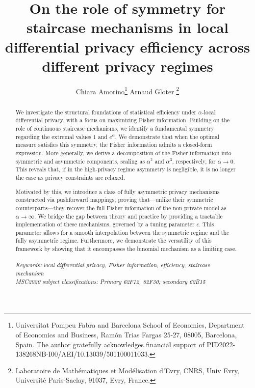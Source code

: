 \documentclass[a4paper, 11pt]{article}
\title{On the role of symmetry for staircase mechanisms in local differential privacy efficiency across different privacy regimes}
\author{Chiara Amorino\thanks{ Universitat Pompeu Fabra and Barcelona School of Economics, Department of Economics and Business, Ram\'on Trias Fargas 25-27, 08005, Barcelona, Spain. The author gratefully acknowledges financial support of PID2022-138268NB-I00/AEI/10.13039/501100011033.} \qquad Arnaud Gloter \thanks{Laboratoire de Math\'ematiques et Mod\'elisation d'Evry, CNRS, Univ Evry, Universit\'e Paris-Saclay, 91037, Evry, France.}}
\theoremstyle{definition}
\begin{document}
\maketitle






\begin{abstract}
\noindent 
We investigate the structural foundations of statistical efficiency under $\alpha$-local differential privacy, with a focus on maximizing Fisher information. Building on the role of continuous staircase mechanisms, we identify a fundamental symmetry regarding the extremal values $1$ and $e^{\alpha}$. We demonstrate that when the optimal measure satisfies this symmetry, the Fisher information admits a closed-form expression. More generally, we derive a decomposition of the Fisher information into symmetric and asymmetric components, scaling as $\alpha^{2}$ and $\alpha^{3}$, respectively,  for $\alpha \to 0$. This reveals that, if in the high-privacy regime asymmetry is negligible, it is no longer the case as privacy constraints are relaxed.

Motivated by this, we introduce a class of fully asymmetric privacy mechanisms constructed via pushforward mappings, proving that—unlike their symmetric counterparts—they recover the full Fisher information of the non-private model as $\alpha \to \infty$. We bridge the gap between theory and practice by providing a tractable implementation of these mechanisms, governed by a tuning parameter $c$. This parameter allows for a smooth interpolation between the symmetric regime and the fully asymmetric regime. Furthermore, we demonstrate the versatility of this framework by showing that it encompasses the binomial mechanism as a limiting case.
\\
\\
\noindent
 \textit{Keywords: local differential privacy, Fisher information, efficiency, staircase mechanism} \\ 
 
\noindent
\textit{MSC2020 subject classifications: Primary 62F12, 62F30; secondary 62B15}
\end{abstract}
\end{document}

